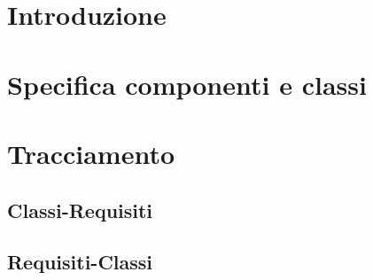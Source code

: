 \documentclass[a4paper, titlepage]{article}
\begin{document}
\pagestyle{fancy}	

\maketitle



\newpage
\tableofcontents

\newpage
\listoffigures

\newpage
\listoftables

\newpage
\clearpage
{}

\section{Introduzione}

\section{Specifica componenti e classi}



\section{Tracciamento}

\subsection{Classi-Requisiti}


\subsection{Requisiti-Classi}

\end{document}
